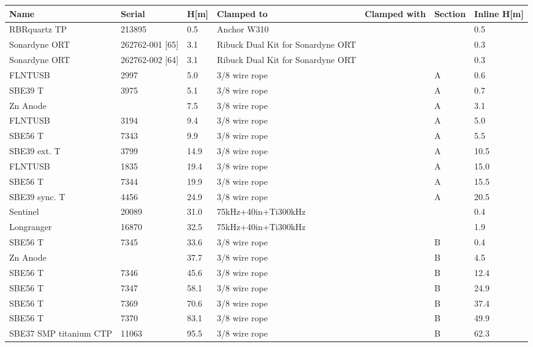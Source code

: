 \documentclass{article}
\begin{document}
\begin{tabularx}{\linewidth}{|X|l|l|X|l|l|l|}
\caption{W310 \textcolor{blue}{$\blacksquare$}: Clamp-on summary}\\
\hline
\textbf{Name} & \textbf{Serial} & \textbf{H[m]} & \textbf{Clamped to} & \textbf{Clamped with} & \textbf{Section} & \textbf{Inline H[m]} \\
\hline
RBRquartz TP & 213895 & 0.5 & Anchor W310 &  &  & 0.5 \\ \hline
Sonardyne ORT & 262762-001 [65] & 3.1 & Ribuck Dual Kit for Sonardyne ORT &  &  & 0.3 \\ \hline
Sonardyne ORT & 262762-002 [64] & 3.1 & Ribuck Dual Kit for Sonardyne ORT &  &  & 0.3 \\ \hline
FLNTUSB & 2997 & 5.0 & 3/8 wire rope &  & A & 0.6 \\ \hline
SBE39 T & 3975 & 5.1 & 3/8 wire rope &  & A & 0.7 \\ \hline
Zn Anode &  & 7.5 & 3/8 wire rope &  & A & 3.1 \\ \hline
FLNTUSB & 3194 & 9.4 & 3/8 wire rope &  & A & 5.0 \\ \hline
SBE56 T & 7343 & 9.9 & 3/8 wire rope &  & A & 5.5 \\ \hline
SBE39 ext. T & 3799 & 14.9 & 3/8 wire rope &  & A & 10.5 \\ \hline
FLNTUSB & 1835 & 19.4 & 3/8 wire rope &  & A & 15.0 \\ \hline
SBE56 T & 7344 & 19.9 & 3/8 wire rope &  & A & 15.5 \\ \hline
SBE39 sync. T & 4456 & 24.9 & 3/8 wire rope &  & A & 20.5 \\ \hline
Sentinel & 20089 & 31.0 & 75kHz+40in+Ti300kHz &  &  & 0.4 \\ \hline
Longranger & 16870 & 32.5 & 75kHz+40in+Ti300kHz &  &  & 1.9 \\ \hline
SBE56 T & 7345 & 33.6 & 3/8 wire rope &  & B & 0.4 \\ \hline
Zn Anode &  & 37.7 & 3/8 wire rope &  & B & 4.5 \\ \hline
SBE56 T & 7346 & 45.6 & 3/8 wire rope &  & B & 12.4 \\ \hline
SBE56 T & 7347 & 58.1 & 3/8 wire rope &  & B & 24.9 \\ \hline
SBE56 T & 7369 & 70.6 & 3/8 wire rope &  & B & 37.4 \\ \hline
SBE56 T & 7370 & 83.1 & 3/8 wire rope &  & B & 49.9 \\ \hline
SBE37 SMP titanium CTP & 11063 & 95.5 & 3/8 wire rope &  & B & 62.3 \\ \hline

\end{tabularx}
\end{document}

